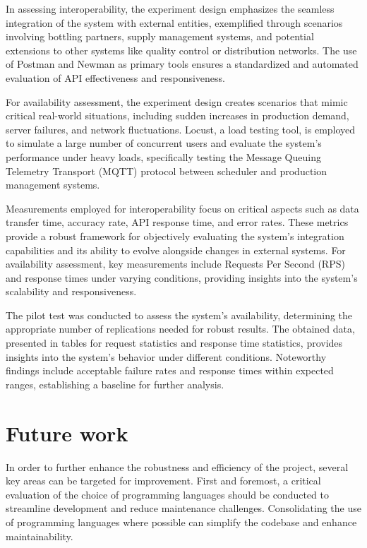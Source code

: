 \documentclass[conference]{IEEEtran}
\begin{document}
In assessing interoperability, the experiment design emphasizes the seamless integration of the system with external entities, exemplified through scenarios involving bottling partners, supply management systems, and potential extensions to other systems like quality control or distribution networks. The use of Postman and Newman as primary tools ensures a standardized and automated evaluation of API effectiveness and responsiveness.

For availability assessment, the experiment design creates scenarios that mimic critical real-world situations, including sudden increases in production demand, server failures, and network fluctuations. Locust, a load testing tool, is employed to simulate a large number of concurrent users and evaluate the system's performance under heavy loads, specifically testing the Message Queuing Telemetry Transport (MQTT) protocol between scheduler and production management systems.

Measurements employed for interoperability focus on critical aspects such as data transfer time, accuracy rate, API response time, and error rates. These metrics provide a robust framework for objectively evaluating the system's integration capabilities and its ability to evolve alongside changes in external systems. For availability assessment, key measurements include Requests Per Second (RPS) and response times under varying conditions, providing insights into the system's scalability and responsiveness.

The pilot test was conducted to assess the system's availability, determining the appropriate number of replications needed for robust results. The obtained data, presented in tables for request statistics and response time statistics, provides insights into the system's behavior under different conditions. Noteworthy findings include acceptable failure rates and response times within expected ranges, establishing a baseline for further analysis.

\section{Future work}

In order to further enhance the robustness and efficiency of the project, several key areas can be targeted for improvement. First and foremost, a critical evaluation of the choice of programming languages should be conducted to streamline development and reduce maintenance challenges. Consolidating the use of programming languages where possible can simplify the codebase and enhance maintainability.
\end{document}
